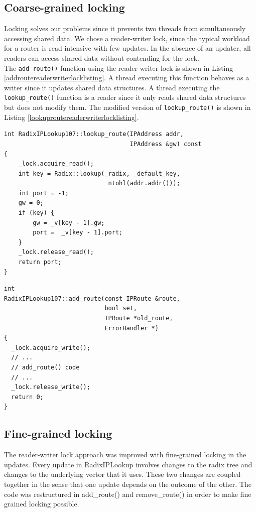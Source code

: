 \documentclass[12pt,a4paper]{article}
\begin{document}
\subsection{Coarse-grained locking}
Locking solves our problems since it prevents two threads from simultaneously accessing shared data. We chose a reader-writer lock, since the typical workload for a router is read intensive with few updates. In the absence of an updater, all readers can access shared data without contending for the lock.\\

The \verb+add_route()+ function using the reader-writer lock is shown in Listing \ref{addroutereaderwriterlocklisting}. A thread executing this function behaves as a writer since it updates shared data structures. A thread executing the \verb+lookup_route()+ function is a reader since it only reads shared data structures but does not modify them. The modified version of \verb+lookup_route()+ is shown in Listing \ref{lookuproutereaderwriterlocklisting}.
\begin{lstlisting}[caption = Reader-writer lock usage in lookup\_route(), label=lookuproutereaderwriterlocklisting,float=tph]
int RadixIPLookup107::lookup_route(IPAddress addr, 
                                   IPAddress &gw) const
{  
    _lock.acquire_read();
    int key = Radix::lookup(_radix, _default_key,
                             ntohl(addr.addr()));
    int port = -1;
    gw = 0;    
    if (key) {
        gw = _v[key - 1].gw;
        port =  _v[key - 1].port;
    }
    _lock.release_read();
    return port;
}
\end{lstlisting}

\begin{lstlisting}[caption = Reader-writer lock usage in add\_route(), label=addroutereaderwriterlocklisting,float=tph]
int
RadixIPLookup107::add_route(const IPRoute &route, 
                            bool set, 
                            IPRoute *old_route, 
                            ErrorHandler *)
{
  _lock.acquire_write();
  // ...
  // add_route() code
  // ...
  _lock.release_write();
  return 0;
}
\end{lstlisting}

\subsection{Fine-grained locking}
The reader-writer lock approach was improved with fine-grained locking in the updates. Every update in RadixIPLookup involves changes to the radix tree and changes to the underlying vector that it uses. These two changes are coupled together in the sense that one update depends on the outcome of the other. The code was restructured in add\_route() and remove\_route() in order to make fine grained locking possible.
\end{document}
